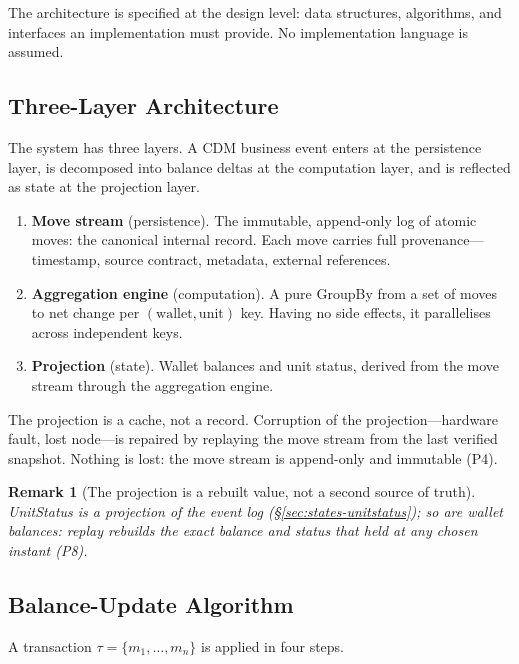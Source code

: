 \documentclass[11pt,a4paper]{article}
\newtheorem{remark}[definition]{Remark}
\begin{document}
The architecture is specified at the design level: data structures, algorithms, and interfaces an implementation must provide. No implementation language is assumed.

\subsection{Three-Layer Architecture}
\label{sec:implementation-layers}

The system has three layers. A CDM business event enters at the persistence layer, is decomposed into balance deltas at the computation layer, and is reflected as state at the projection layer.

\begin{enumerate}[nosep]
\item \textbf{Move stream} (persistence). The immutable, append-only log of atomic moves: the canonical internal record. Each move carries full provenance---timestamp, source contract, metadata, external references.
\item \textbf{Aggregation engine} (computation). A pure GroupBy from a set of moves to net change per $(\text{wallet},\text{unit})$ key. Having no side effects, it parallelises across independent keys.
\item \textbf{Projection} (state). Wallet balances and unit status, derived from the move stream through the aggregation engine.
\end{enumerate}

The projection is a cache, not a record. Corruption of the projection---hardware fault, lost node---is repaired by replaying the move stream from the last verified snapshot. Nothing is lost: the move stream is append-only and immutable (P4).

\begin{remark}[The projection is a rebuilt value, not a second source of truth]
UnitStatus is a projection of the event log (\S\ref{sec:states-unitstatus}); so are wallet balances: replay rebuilds the exact balance and status that held at any chosen instant (P8).
\end{remark}

\subsection{Balance-Update Algorithm}
\label{sec:implementation-update}

A transaction $\tau=\{m_1,\dots,m_n\}$ is applied in four steps.
\end{document}
